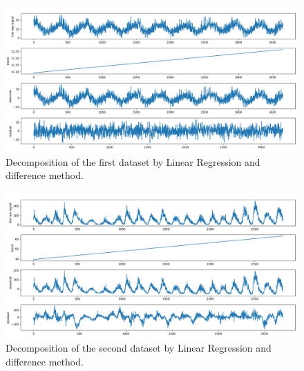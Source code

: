 \begin{figure}[H]
    \centering
    \begin{minipage}[b]{1\textwidth}
        \includegraphics[width=\textwidth]{figures/Ass1/Ass1_D1_LinearRegression_diff.png}
    \end{minipage}
    \caption{Decomposition of the first dataset by Linear Regression and difference method.}
    \label{fig:Ass1_D1_LinearRegression_diff}
\end{figure}

\begin{figure}[H]
    \centering
    \begin{minipage}[b]{1\textwidth}
        \includegraphics[width=\textwidth]{figures/Ass1/Ass1_D2_LinearRegression_diff.png}
    \end{minipage}
    \caption{Decomposition of the second dataset by Linear Regression and difference method.}
    \label{fig:Ass1_D2_LinearRegression_diff}
\end{figure}

